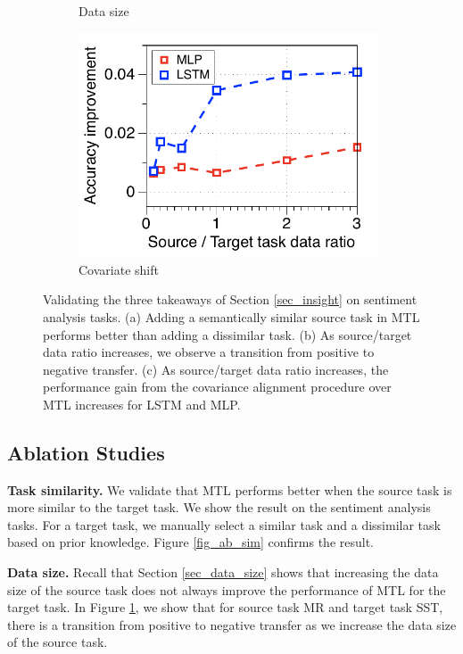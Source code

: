\begin{figure}[!t]
\begin{subfigure}[b]{0.33\textwidth}
		\caption{Data size}
		\label{fig_ab_data}
	\end{subfigure}
	\begin{subfigure}[b]{0.33\textwidth}
		\centering
		\includegraphics[width=0.975\textwidth]{figures/ratio_alignment_norm_diff_all.pdf}
		\caption{Covariate shift}
		\label{fig_ab_cov}
	\end{subfigure}
	\caption{Validating the three takeaways of Section \ref{sec_insight} on sentiment analysis tasks. (a) Adding a semantically similar source task in MTL performs better than adding a dissimilar task.
	(b) As source/target data ratio increases, we observe a transition from positive to negative transfer.
	(c) As source/target data ratio increases, the performance gain from the covariance alignment procedure \cite{WZR20} over MTL increases for LSTM and MLP.}
	\label{fig_ablation}
\end{figure}


\subsection{Ablation Studies}


\textbf{Task similarity.} We validate that MTL performs better when the source task is more similar to the target task.
We show the result on the sentiment analysis tasks.
For a target task, we manually select a similar task and a dissimilar task based on prior knowledge.
Figure \ref{fig_ab_sim} confirms the result.


\textbf{Data size.}
Recall that Section \ref{sec_data_size} shows that increasing the data size of the source task does not always improve the performance of MTL for the target task.
In Figure \ref{fig_ab_data}, we show that for source task MR and target task SST, there is a transition from positive to negative transfer as we increase the data size of the source task.

